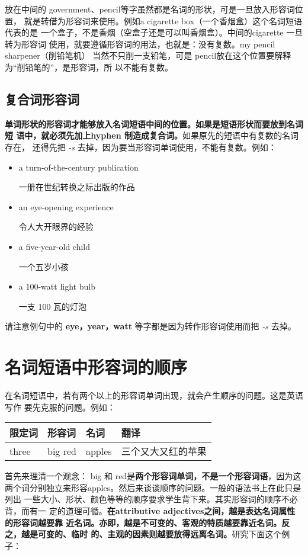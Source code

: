 \documentclass{yufa}
\begin{document}
放在中间的 government、pencil等字虽然都是名词的形状，可是一旦放入形容词位置，
就是转借为形容词来使用。例如a cigarette box（一个香烟盒）这个名词短语代表的是
一个盒子，不是香烟（空盒子还是可以叫香烟盒）。中间的cigarette 一旦转为形容词
使用，就要遵循形容词的用法，也就是：没有复数。my pencil sharpener（削铅笔机）
当然不只削一支铅笔，可是 pencil放在这个位置要解释为“削铅笔的”，是形容词，所
以不能有复数。

\subsection{复合词形容词}

\textbf{单词形状的形容词才能够放入名词短语中间的位置。如果是短语形状而要放到名词短
  语中，就必须先加上hyphen 制造成复合词。}如果原先的短语中有复数的名词存在，
还得先把 \emph{-s} 去掉，因为要当形容词单词使用，不能有复数。例如：

\begin{itemize}
\item  a turn-of-the-century publication

  一册在世纪转换之际出版的作品
\item  an eye-opening experience

  令人大开眼界的经验
\item  a five-year-old child

  一个五岁小孩
\item  a 100-watt light bulb

  一支 100 瓦的灯泡
\end{itemize}

请注意例句中的 \textbf{eye，year，watt} 等字都是因为转作形容词使用而把 \emph{-s} 去掉。

\section{名词短语中形容词的顺序}

在名词短语中，若有两个以上的形容词单词出现，就会产生顺序的问题。这是英语写作
要先克服的问题。例如：

\begin{longtable}[]{@{}llll@{}}
  \toprule\noalign{}
  限定词 & 形容词 & 名词 & 翻译 \\
  \midrule\noalign{}
  \endhead
  \bottomrule\noalign{}
  \endlastfoot
  three & big red & apples & 三个又大又红的苹果 \\
\end{longtable}

首先来理清一个观念： big 和 red是\textbf{两个形容词单词，不是一个形容词语}，因为这
两个词分别独立来形容apples。然后来谈谈顺序的问题。一般的语法书上在此只是列出
一些大小、形状、颜色等等的顺序要求学生背下来。其实形容词的顺序不必背，而有一
定的道理可循。\textbf{在attributive adjectives之间，越是表达名词属性的形容词越要靠
  近名词。亦即，越是不可变的、客观的特质越要靠近名词。反之，越是可变的、临时
  的、主观的因素则越要放得远离名词。}研究下面这个例子：
\end{document}
